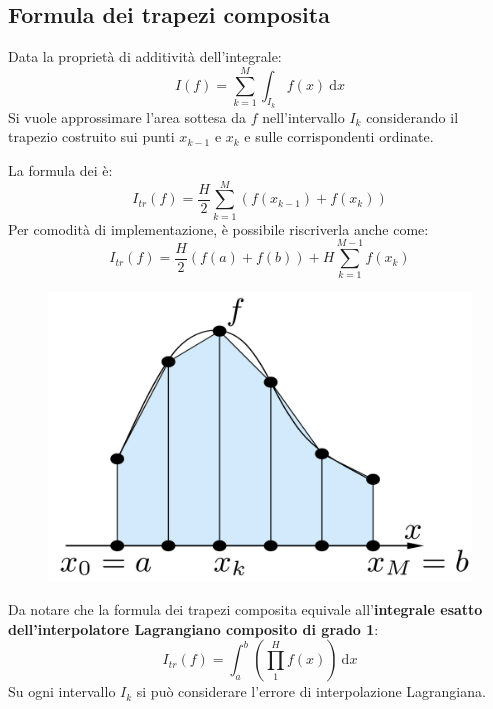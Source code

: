 \subsection{Formula dei trapezi composita}

Data la proprietà di additività dell'integrale:
\begin{equation*}
	I\left(f\right) = \displaystyle\sum_{k=1}^{M} \int_{I_{k}} f\left(x\right) \:\mathrm{d}x
\end{equation*}
Si vuole approssimare l'area sottesa da $f$ nell'intervallo $I_{k}$ considerando il trapezio costruito sui punti $x_{k-1}$ e $x_{k}$ e sulle corrispondenti ordinate.

\highspace
La formula dei  è:
\begin{equation}
	I_{tr}\left(f\right) = \dfrac{H}{2} \displaystyle\sum_{k=1}^{M} \left(f\left(x_{k-1}\right) + f\left(x_{k}\right)\right)
\end{equation}
Per comodità di implementazione, è possibile riscriverla anche come:
\begin{equation*}
	I_{tr}\left(f\right) = \dfrac{H}{2} \left(f\left(a\right) + f\left(b\right)\right) + H \sum_{k=1}^{M-1} f\left(x_{k}\right)
\end{equation*}
\begin{figure}[!htp]
	\centering
	\includegraphics[width=.4\textwidth]{img/formule-di-quadratura-3.png}
\end{figure}

\noindent
Da notare che la formula dei trapezi composita equivale all'\textbf{integrale esatto dell'interpolatore Lagrangiano composito di grado 1}:
\begin{equation}
	I_{tr}\left(f\right) = \displaystyle \int_{a}^{b} \left(\displaystyle\prod_{1}^{H} f\left(x\right)\right) \:\mathrm{d}x
\end{equation}
Su ogni intervallo $I_{k}$ si può considerare l'errore di interpolazione Lagrangiana. 


